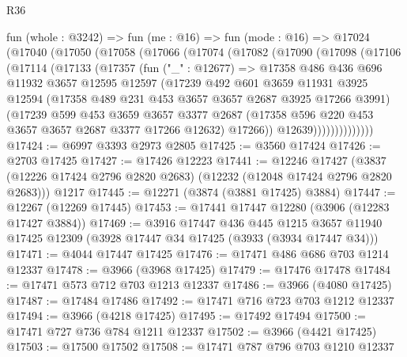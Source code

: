 \begin{lexlean}{R36}
\begin{coremodule}
    fun (whole : @3242) =>
    fun (me : @16) =>
    fun (mode : @16) =>
    @17024
      (@17040
        (@17050
          (@17058
            (@17066
              (@17074
                (@17082
                  (@17090
                    (@17098
                      (@17106
                        (@17114
                          (@17133
                            (@17357
                              (fun ("_" : @12677) =>
                              @17358
                                @486
                                @436
                                @696
                                @11932
                                @3657
                                @12595
                                @12597
                                (@17239
                                  @492
                                  @601
                                  @3659
                                  @11931
                                  @3925
                                  @12594
                                  (@17358 @489 @231 @453 @3657 @3657 @2687 @3925 @17266 @3991)
                                  (@17239
                                    @599
                                    @453
                                    @3659
                                    @3657
                                    @3377
                                    @2687
                                    (@17358 @596 @220 @453 @3657 @3657 @2687 @3377 @17266 @12632)
                                    @17266))
                                @12639))))))))))))))
@17424 := @6997 @3393 @2973 @2805
@17425 := @3560 @17424
@17426 := @2703 @17425
@17427 := @17426 @12223
@17441 := @12246
    @17427
    (@3837 (@12226 @17424 @2796 @2820 @2683) (@12232 (@12048 @17424 @2796 @2820 @2683)))
    @1217
@17445 := @12271 (@3874 (@3881 @17425) @3884)
@17447 := @12267 (@12269 @17445)
@17453 := @17441 @17447 @12280 (@3906 (@12283 @17427 @3884))
@17469 := @3916
    @17447
    @436
    @445
    @1215
    @3657
    @11940
    @17425
    @12309
    (@3928 @17447 @34 @17425 (@3933 (@3934 @17447 @34)))
@17471 := @4044 @17447 @17425
@17476 := @17471 @486 @686 @703 @1214 @12337
@17478 := @3966 (@3968 @17425)
@17479 := @17476 @17478
@17484 := @17471 @573 @712 @703 @1213 @12337
@17486 := @3966 (@4080 @17425)
@17487 := @17484 @17486
@17492 := @17471 @716 @723 @703 @1212 @12337
@17494 := @3966 (@4218 @17425)
@17495 := @17492 @17494
@17500 := @17471 @727 @736 @784 @1211 @12337
@17502 := @3966 (@4421 @17425)
@17503 := @17500 @17502
@17508 := @17471 @787 @796 @703 @1210 @12337

\end{coremodule}
\end{lexlean}
